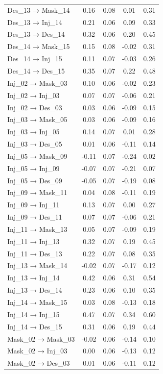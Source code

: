 \documentclass[
  english,
  man,floatsintext]{apa6}
\begin{document}
\begin{center}
\begin{ThreePartTable}
\begin{longtable}{lcccc}
Des\_13 → Mask\_14 & 0.16 & 0.08 & 0.01 & 0.31\\
Des\_13 → Inj\_14 & 0.21 & 0.06 & 0.09 & 0.33\\
Des\_13 → Des\_14 & 0.32 & 0.06 & 0.20 & 0.45\\
Des\_14 → Mask\_15 & 0.15 & 0.08 & -0.02 & 0.31\\
Des\_14 → Inj\_15 & 0.11 & 0.07 & -0.03 & 0.26\\
Des\_14 → Des\_15 & 0.35 & 0.07 & 0.22 & 0.48\\
Inj\_02 → Mask\_03 & 0.10 & 0.06 & -0.02 & 0.23\\
Inj\_02 → Inj\_03 & 0.07 & 0.07 & -0.06 & 0.21\\
Inj\_02 → Des\_03 & 0.03 & 0.06 & -0.09 & 0.15\\
Inj\_03 → Mask\_05 & 0.03 & 0.06 & -0.09 & 0.16\\
Inj\_03 → Inj\_05 & 0.14 & 0.07 & 0.01 & 0.28\\
Inj\_03 → Des\_05 & 0.01 & 0.06 & -0.11 & 0.14\\
Inj\_05 → Mask\_09 & -0.11 & 0.07 & -0.24 & 0.02\\
Inj\_05 → Inj\_09 & -0.07 & 0.07 & -0.21 & 0.07\\
Inj\_05 → Des\_09 & -0.05 & 0.07 & -0.19 & 0.08\\
Inj\_09 → Mask\_11 & 0.04 & 0.08 & -0.11 & 0.19\\
Inj\_09 → Inj\_11 & 0.13 & 0.07 & 0.00 & 0.27\\
Inj\_09 → Des\_11 & 0.07 & 0.07 & -0.06 & 0.21\\
Inj\_11 → Mask\_13 & 0.05 & 0.07 & -0.09 & 0.19\\
Inj\_11 → Inj\_13 & 0.32 & 0.07 & 0.19 & 0.45\\
Inj\_11 → Des\_13 & 0.22 & 0.07 & 0.08 & 0.35\\
Inj\_13 → Mask\_14 & -0.02 & 0.07 & -0.17 & 0.12\\
Inj\_13 → Inj\_14 & 0.42 & 0.06 & 0.31 & 0.54\\
Inj\_13 → Des\_14 & 0.23 & 0.06 & 0.10 & 0.35\\
Inj\_14 → Mask\_15 & 0.03 & 0.08 & -0.13 & 0.18\\
Inj\_14 → Inj\_15 & 0.47 & 0.07 & 0.34 & 0.60\\
Inj\_14 → Des\_15 & 0.31 & 0.06 & 0.19 & 0.44\\
Mask\_02 → Mask\_03 & -0.02 & 0.06 & -0.14 & 0.10\\
Mask\_02 → Inj\_03 & 0.00 & 0.06 & -0.13 & 0.12\\
Mask\_02 → Des\_03 & 0.01 & 0.06 & -0.11 & 0.12\\

\end{longtable}
\end{ThreePartTable}
\end{center}
\end{document}
